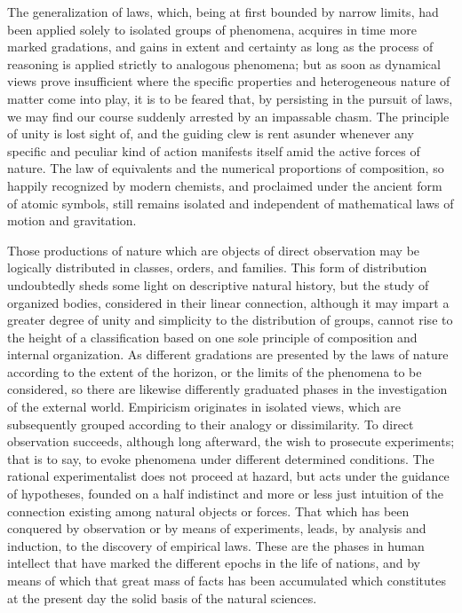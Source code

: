 The generalization of laws, which, being at first bounded by narrow limits, had been applied solely to isolated groups of phenomena, acquires in time more marked gradations, and gains in extent and certainty as long as the process of reasoning is applied strictly to analogous phenomena; but as soon as dynamical views prove insufficient where the specific properties and heterogeneous nature of matter come into play, it is to be feared that, by persisting in the pursuit of laws, we may find our course suddenly arrested by an impassable chasm. The principle of unity is lost sight of, and the guiding clew is rent asunder whenever any specific and peculiar kind of action manifests itself amid the active forces of nature. The law of equivalents and the numerical proportions of composition, so happily recognized by modern chemists, and proclaimed under the ancient form of atomic symbols, still remains isolated and independent of mathematical laws of motion and gravitation.

Those productions of nature which are objects of direct observation may be logically distributed in classes, orders, and families. This form of distribution undoubtedly sheds some light on descriptive natural history, but the study of organized bodies, considered in their linear connection, although it may impart a greater degree of unity and simplicity to the distribution of groups, cannot rise to the height of a classification based on one sole principle of composition and internal organization. As different gradations are presented by the laws of nature according to the extent of the horizon, or the limits of the phenomena to be considered, so there are likewise differently graduated phases in the investigation of the external world. Empiricism originates in isolated views, which are subsequently grouped according to their analogy or dissimilarity. To direct observation succeeds, although long afterward, the wish to prosecute experiments; that is to say, to evoke phenomena under different determined conditions. The rational experimentalist does not proceed at hazard, but acts under the guidance of hypotheses, founded on a half indistinct and more or less just intuition of the connection existing among natural objects or forces. That which has been conquered by observation or by means of experiments, leads, by analysis and induction, to the discovery of empirical laws. These are the phases in human intellect that have marked the different epochs in the life of nations, and by means of which that great mass of facts has been accumulated which constitutes at the present day the solid basis of the natural sciences.

